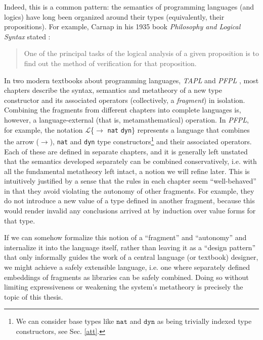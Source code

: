 Indeed, this is a common pattern: the semantics of programming languages (and logics) have long been organized around their types (equivalently, their propositions). %
For example, Carnap in his 1935 book \emph{Philosophy and Logical Syntax} stated \cite{carnap1935philosophy}:
\begin{quote}
One of the principal tasks of the logical analysis of a given proposition is to find out the method of verification for that proposition.
\end{quote}
In two modern textbooks about programming languages, \emph{TAPL} \cite{tapl} and \emph{PFPL} \cite{pfpl}, most chapters describe the syntax, semantics and metatheory of a new type constructor and its associated  operators (collectively, a \emph{fragment}) in isolation. Combining the fragments from different chapters into complete languages is, however, a language-external (that is, metamathematical) operation. In \emph{PFPL}, for example,  the notation $\mathcal{L}$\{$\rightarrow$ \verb|nat| \verb|dyn|\} represents a language that combines the arrow ($\rightarrow$), \verb|nat| and \verb|dyn| type constructors\footnote{We can consider base types like $\mathtt{nat}$ and $\mathtt{dyn}$ as being trivially indexed type constructors, see Sec. \ref{att}.} and their associated operators. Each of these are defined in separate chapters, and it is generally left unstated that the semantics developed separately can be combined conservatively, i.e. with all the fundamental metatheory left intact, a notion we will refine later. This is intuitively justified by a sense that the rules in each chapter seem ``well-behaved'' in that they  avoid violating the autonomy of other fragments. %
For example, they do not introduce a new value of a type defined in another fragment, because this would render invalid any conclusions arrived at by induction over value forms for that type. 

If we can somehow formalize this notion of a ``fragment'' and ``autonomy'' and internalize it into the language itself, rather than leaving it as a ``design pattern'' that only informally guides the work of a central language (or textbook) designer, we might achieve  a safely extensible language, i.e. one where separately defined embeddings of  fragments as libraries can be safely combined. Doing so without limiting expressiveness or weakening the system's metatheory is precisely the topic of this thesis. %


